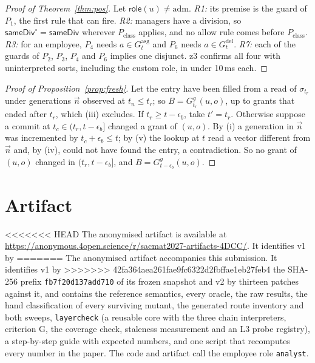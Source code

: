 \documentclass[sigconf,review,anonymous]{acmart}
\newcommand{\Pc}{P_{\mathrm{class}}}
\newcommand{\Gasg}{G^{\mathrm{asg}}}
\newcommand{\Gdel}{G^{\mathrm{del}}}
\newcommand{\sameDiv}{\mathsf{sameDiv}}
\newcommand{\role}{\mathsf{role}}
\begin{document}
\begin{proof}[Proof of Theorem~\ref{thm:pos}]
Let $\role(u)\neq\mathrm{adm}$. \emph{R1:} its premise is the guard of $P_1$, the first rule that can fire.
\emph{R2:} managers have a division, so $\sameDiv^\circ=\sameDiv$ wherever $\Pc$ applies, and no allow rule comes
before $\Pc$. \emph{R3:} for an employee, $P_4$ needs $a\in\Gasg_t$ and $P_6$ needs $a\in\Gdel_t$. \emph{R7:} each of
the guards of $P_2$, $P_3$, $P_4$ and $P_6$ implies one disjunct. z3 confirms all four with uninterpreted sorts,
including the custom role, in under 10\,ms each.
\end{proof}

\begin{proof}[Proof of Proposition~\ref{prop:fresh}]
Let the entry have been filled from a read of $\sigma_{t_r}$ under generations $\vec{n}$ observed at $t_n\le t_r$; so
$B=G^g_{t_r}(u,o)$, up to grants that ended after $t_r$, which (iii) excludes. If $t_r\ge t-\epsilon_b$, take
$t'=t_r$. Otherwise suppose a commit at $t_c\in(t_r,t-\epsilon_b]$ changed a grant of $(u,o)$. By (i) a generation in
$\vec{n}$ was incremented by $t_c+\epsilon_b\le t$; by (v) the lookup at $t$ read a vector different from $\vec{n}$
and, by (iv), could not have found the entry, a contradiction. So no grant of $(u,o)$ changed in
$(t_r,t-\epsilon_b]$, and $B=G^g_{t-\epsilon_b}(u,o)$.
\end{proof}

\section{Artifact}
\label{app:artifact}
<<<<<<< HEAD
The anonymised artifact is available at
\url{https://anonymous.4open.science/r/sacmat2027-artifacts-4DCC/}. It identifies v1 by
=======
The anonymised artifact accompanies this submission. It identifies v1 by
>>>>>>> 42fa364aea261fae9fc6322d2fbffae1eb27feb4
the SHA-256 prefix \texttt{fb7f20d137add710} of its frozen snapshot and v2 by thirteen patches against it, and contains
the reference semantics, every oracle, the raw results, the hand classification of every surviving mutant, the
generated route inventory and both sweeps, \texttt{layercheck} (a reusable core with the three chain interpreters,
criterion G, the coverage check, staleness measurement and an L3 probe registry), a step-by-step guide with expected
numbers, and one script that recomputes every number in the paper. The code and artifact call the employee role
\texttt{analyst}.
\end{document}
